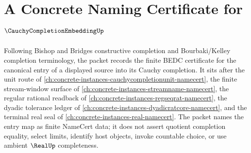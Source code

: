 \chapter{A Concrete Naming Certificate for $\CauchyCompletionEmbeddingUp$}
\label{ch:concrete-instances-cauchy-completion-embedding-namecert}

Following Bishop and Bridges constructive completion and Bourbaki/Kelley completion terminology, the packet records the finite BEDC certificate for the canonical entry of a displayed source into its Cauchy completion. It sits after the unit route of \autoref{ch:concrete-instances-cauchycompletionunit-namecert}, the finite stream-window surface of \autoref{ch:concrete-instances-streamname-namecert}, the regular rational readback of \autoref{ch:concrete-instances-regseqrat-namecert}, the dyadic tolerance ledger of \autoref{ch:concrete-instances-dyadicratcore-namecert}, and the terminal real seal of \autoref{ch:concrete-instances-real-namecert}. The packet names the entry map as finite NameCert data; it does not assert quotient completion equality, select limits, identify host objects, invoke countable choice, or use ambient $\RealUp$ completeness.

